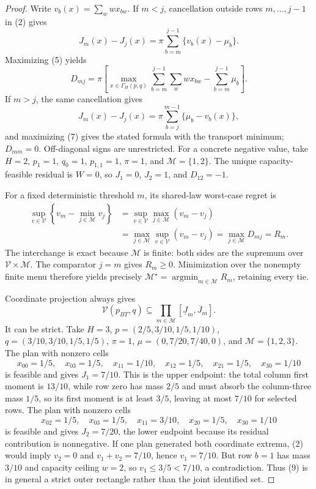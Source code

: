\documentclass{article}
\begin{document}
\begin{proof}
Write \(v_b(x)=\sum_wwx_{bw}\).  If \(m<j\), cancellation outside rows \(m,\ldots,j-1\) in (2) gives
\[
 J_m(x)-J_j(x)=\pi\sum_{b=m}^{j-1}\{v_b(x)-\mu_b\}.       \tag{5}
\]
Maximizing (5) yields
\[
 D_{mj}=\pi\left[\max_{x\in\Gamma_H(p,q)}
 \sum_{b=m}^{j-1}\sum_wwx_{bw}-\sum_{b=m}^{j-1}\mu_b\right].              \tag{6}
\]
If \(m>j\), the same cancellation gives
\[
 J_m(x)-J_j(x)=\pi\sum_{b=j}^{m-1}\{\mu_b-v_b(x)\},       \tag{7}
\]
and maximizing (7) gives the stated formula with the transport minimum; \(D_{mm}=0\).  Off-diagonal signs are unrestricted.  For a concrete negative value, take \(H=2\), \(p_1=1\), \(q_0=1\), \(p_{1,1}=1\), \(\pi=1\), and \(\mathcal M=\{1,2\}\).  The unique capacity-feasible residual is \(W=0\), so \(J_1=0\), \(J_2=1\), and \(D_{12}=-1\).

For a fixed deterministic threshold \(m\), its shared-law worst-case regret is
\[
 \begin{aligned}
 \sup_{v\in\mathcal V}\left\{v_m-\min_{j\in\mathcal M}v_j\right\}
 &=\sup_{v\in\mathcal V}\max_{j\in\mathcal M}(v_m-v_j)\\
 &=\max_{j\in\mathcal M}\sup_{v\in\mathcal V}(v_m-v_j)
 =\max_{j\in\mathcal M}D_{mj}=R_m.                       \tag{8}
 \end{aligned}
\]
The interchange is exact because \(\mathcal M\) is finite: both sides are the supremum over \(\mathcal V\times\mathcal M\).  The comparator \(j=m\) gives \(R_m\ge0\).  Minimization over the nonempty finite menu therefore yields precisely \(\mathcal M^\star=\operatorname*{argmin}_{m\in\mathcal M}R_m\), retaining every tie.

Coordinate projection always gives
\[
 \mathcal V(p_{BT},q)\subseteq
 \prod_{m\in\mathcal M}[\underline J_m,\overline J_m].    \tag{9}
\]
It can be strict.  Take \(H=3\), \(p=(2/5,3/10,1/5,1/10)\), \(q=(3/10,3/10,1/5,1/5)\), \(\pi=1\), \(\mu=(0,7/20,7/40,0)\), and \(\mathcal M=\{1,2,3\}\).  The plan with nonzero cells
\[
 x_{00}=1/5,\quad x_{03}=1/5,\quad x_{11}=1/10,\quad
 x_{12}=1/5,\quad x_{21}=1/5,\quad x_{30}=1/10             \tag{10}
\]
is feasible and gives \(J_1=7/10\).  This is the upper endpoint: the total column first moment is \(13/10\), while row zero has mass \(2/5\) and must absorb the column-three mass \(1/5\), so its first moment is at least \(3/5\), leaving at most \(7/10\) for selected rows.  The plan with nonzero cells
\[
 x_{02}=1/5,\quad x_{03}=1/5,\quad x_{11}=3/10,\quad
 x_{20}=1/5,\quad x_{30}=1/10                              \tag{11}
\]
is feasible and gives \(J_2=7/20\), the lower endpoint because its residual contribution is nonnegative.  If one plan generated both coordinate extrema, (2) would imply \(v_2=0\) and \(v_1+v_2=7/10\), hence \(v_1=7/10\).  But row \(b=1\) has mass \(3/10\) and capacity ceiling \(w=2\), so \(v_1\le3/5<7/10\), a contradiction.  Thus (9) is in general a strict outer rectangle rather than the joint identified set.
\end{proof}
\end{document}
